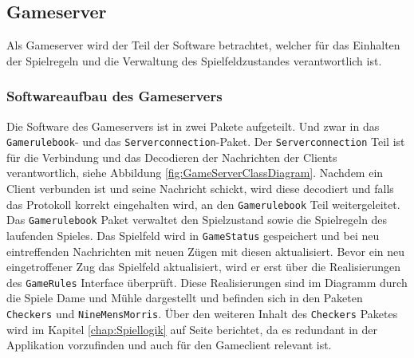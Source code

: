 \documentclass[12pt,a4paper,bibliography=totocnumbered,listof=totocnumbered]{article}
\begin{document}
\subsection{Gameserver}
Als Gameserver wird der Teil der Software betrachtet, welcher für das Einhalten der Spielregeln und die Verwaltung des Spielfeldzustandes 
verantwortlich ist. 

\subsubsection{Softwareaufbau des Gameservers}
Die Software des Gameservers ist in zwei Pakete aufgeteilt. Und zwar in das \texttt{Gamerulebook}- und das \texttt{Serverconnection}-Paket.
Der \texttt{Serverconnection} Teil ist für die Verbindung und das Decodieren der Nachrichten der Clients verantwortlich, siehe Abbildung \ref{fig:GameServerClassDiagram}.
Nachdem ein Client verbunden ist und seine Nachricht schickt, wird diese decodiert und falls das Protokoll korrekt eingehalten wird,
an den \texttt{Gamerulebook} Teil weitergeleitet. Das \texttt{Gamerulebook} Paket verwaltet den Spielzustand sowie die Spielregeln des laufenden Spieles.
Das Spielfeld wird in \texttt{GameStatus} gespeichert und bei neu eintreffenden Nachrichten mit neuen Zügen mit diesen aktualisiert.
Bevor ein neu eingetroffener Zug das Spielfeld aktualisiert, wird er erst über die Realisierungen des \texttt{GameRules} Interface überprüft.
Diese Realisierungen sind im Diagramm durch die Spiele Dame und Mühle dargestellt und befinden sich in den Paketen \texttt{Checkers} und \texttt{NineMensMorris}.
Über den weiteren Inhalt des \texttt{Checkers} Paketes wird im Kapitel \ref{chap:Spiellogik} auf Seite \pageref{chap:Spiellogik} berichtet, da es 
redundant in der Applikation vorzufinden und auch für den Gameclient relevant ist.
\end{document}
